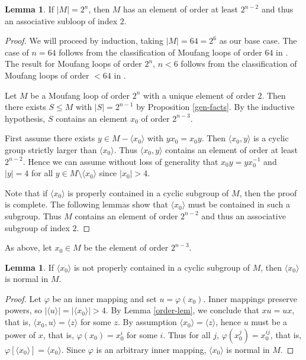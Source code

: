 \documentclass[12pt]{report}
\theoremstyle{definition}
\newtheorem{lem}[thm]{Lemma}
\begin{document}
\begin{lem}\label{index2subloop}
	If $|M| = 2^n$, then $M$ has an element of order at least $2^{n - 2}$ and thus an associative subloop of index $2$.
\end{lem}

\begin{proof}
  We will proceed by induction, taking $|M| = 64 = 2^6$ as our base case. The case of $n = 64$ follows from the
    classification of Moufang loops of order $64$ in \cite{64and81}. The result for Moufang loops of order
    $2^n$, $n < 6$ follows from the classification of Moufang loops of order $< 64$ in \cite{Chein} \cite{Goodaire}.

  Let $M$ be a Moufang loop of order $2^n$ with a unique element of order $2$. Then there exists $S\leq M$
    with $|S| = 2^{n - 1}$ by Proposition \ref{gen-facts}. By the inductive hypothesis, $S$ contains an
    element $x_0$ of order $2^{n - 3}$.

	First assume there exists $y\in M- \langle x_0 \rangle$ with $yx_0 = x_0 y$. Then $\langle x_0, y\rangle$
    is a cyclic group strictly larger than $\langle x_0\rangle$. Thus $\langle x_0, y\rangle$ contains an
    element of order at least $2^{n - 2}$. Hence we can assume without loss of generality that
    $x_0 y = yx_0^{-1}$ and $|y| = 4$ for all $y\in M\setminus \langle x_0 \rangle$ since $|x_0| > 4$.

	Note that if $\langle x_0\rangle$ is properly contained in a cyclic subgroup of $M$, then the proof is
    complete. The following lemmas show that $\langle x_0\rangle$ must be contained in such a subgroup.
    Thus $M$ contains an element of order $2^{n - 2}$ and thus an associative subgroup of index $2$.
\end{proof}

As above, let $x_0\in M$ be the element of order $2^{n - 3}$.

\begin{lem}
	If $\langle x_0\rangle$ is not properly contained in a cyclic subgroup of $M$, then $\langle x_0\rangle$ is normal in $M$.
\end{lem}

\begin{proof}
	Let $\varphi$ be an inner mapping and set $u = \varphi(x_0)$. Inner mappings preserve powers, so
    $|\langle u\rangle| = |\langle x_0\rangle| > 4$. By Lemma \ref{order-lem}, we conclude that $xu = ux$,
    that is, $\langle x_0,u\rangle = \langle z\rangle$ for some $z$. By assumption
    $\langle x_0\rangle = \langle z\rangle$, hence $u$ must be a power of $x$, that is, $\varphi(x_0) = x_0^i$
    for some $i$. Thus for all $j$, $\varphi(x_0^j) = x_0^{ij}$, that is,
    $\varphi[\langle x_0\rangle]= \langle x_0\rangle$. Since $\varphi$ is an arbitrary inner mapping,
    $\langle x_0\rangle$ is normal in $M$.
\end{proof}
\end{document}
